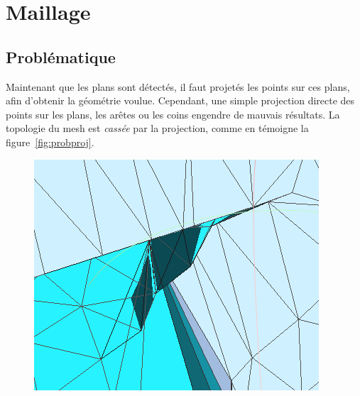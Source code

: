 ﻿\documentclass[12pt, twoside]{article}
\let\oldsection\section
\def\section{\cleardoublepage\oldsection}
\begin{document}
\section{Maillage}
\subsection{Problématique}
Maintenant que les plans sont détectés, il faut projetés les points sur ces plans, afin d'obtenir la géométrie voulue. Cependant, une simple projection directe des points sur les plans, les arêtes ou les coins engendre de mauvais résultats. La topologie du mesh est \textit{cassée} par la projection, comme en témoigne la figure~\ref{fig:probproj}.

\begin{figure}[h]
\centering
\includegraphics[scale=0.55]{prob1.png} \includ
\end{figure}
\end{document}
